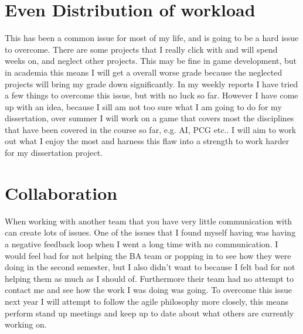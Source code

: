 \documentclass{scrartcl}
\begin{document}
\section{Even Distribution of workload}
This has been a common issue for most of my life, and is going to be a hard issue to overcome. There are some projects that I really click with and will spend weeks on, and neglect other projects. This may be fine in game development, but in academia this means I will get a overall worse grade because the neglected projects will bring my grade down significantly.
In my weekly reports I have tried a few things to overcome this issue, but with no luck so far. However I have come up with an idea, because I sill am not too sure what I am going to do for my dissertation, over summer I will work on a game that covers most the disciplines that have been covered in the course so far, e.g. AI, PCG etc.. I will aim to work out what I enjoy the most and harness this flaw into a strength to work harder for my dissertation project.

\section{Collaboration}
When working with another team that you have very little communication with can create lots of issues. One of the issues that I found myself having was having a negative feedback loop when I went a long time with no communication. I would feel bad for not helping the BA team or popping in to see how they were doing in the second semester, but I also didn't want to because I felt bad for not helping them as much as I should of. Furthermore their team had no attempt to contact me and see how the work I was doing was going.
To overcome this issue next year I will attempt to follow the agile philosophy more closely, this means perform stand up meetings and keep up to date about what others are currently working on. 

\end{document}
